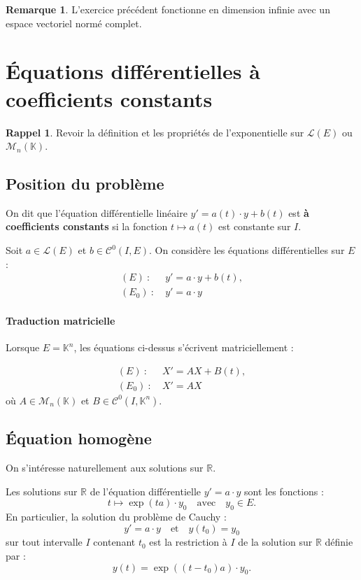 \documentclass[french]{article}
\newcommand{\R}{\mathbb{R}}
\newcommand{\K}{\mathbb{K}}
\theoremstyle{plain}
\theoremstyle{definition}
\newtheorem*{rmq}{Remarque}
\newtheorem*{rappel}{Rappel}
\theoremstyle{remark}
\begin{document}
\begin{rmq}
	L'exercice précédent fonctionne en dimension infinie avec un espace vectoriel normé complet.
\end{rmq}

\section{Équations différentielles à coefficients constants}

\begin{rappel}
	Revoir la définition et les propriétés de l'exponentielle sur $\mathcal{L}(E)$ ou $\mathcal{M}_n(\K)$.
\end{rappel}

\subsection{Position du problème}

\begin{dfn}
	On dit que l'équation différentielle linéaire $y'=a(t)\cdot y+b(t)$ est \textbf{à coefficients constants} si la fonction $t\mapsto a(t)$ est constante sur $I$.
\end{dfn}

Soit $a\in\mathcal{L}(E)$ et $b\in\mathcal{C}^0(I,E)$. On considère les équations différentielles sur $E$ :
\begin{align*}
	(E)\ :\ &y'=a\cdot y+b(t),\\
	(E_0)\ :\ &y'=a\cdot y
\end{align*}

\paragraph{Traduction matricielle} Lorsque $E=\K^n$, les équations ci-dessus s'écrivent matriciellement :

\begin{align*}
	(E)\ :\ &X'=AX+B(t),\\
	(E_0)\ :\ &X'=AX
\end{align*} où  $A\in\mathcal{M}_n(\K)$ et $B\in\mathcal{C}^0(I,\K^n)$.

\subsection{Équation homogène}

On s'intéresse naturellement aux solutions sur $\R$.

\begin{prop}%
	Les solutions sur $\R$ de l'équation différentielle $y'=a\cdot y$ sont les fonctions :
	$$t\mapsto\exp(ta)\cdot y_0\quad\text{avec}\quad y_0\in E.$$
	En particulier, la solution du problème de Cauchy :
	$$y'=a\cdot y\quad\text{et}\quad y(t_0)=y_0$$
	sur tout intervalle $I$ contenant $t_0$ est la restriction à $I$ de la solution sur $\R$ définie par :
	$$y(t)=\exp((t-t_0)a)\cdot y_0.$$
\end{prop}
\end{document}
